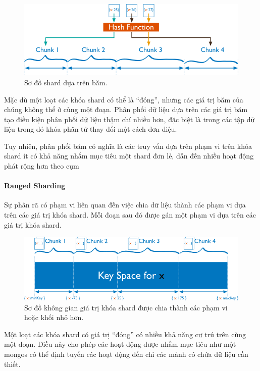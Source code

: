 \begin{figure}[h!]
\centering
\captionsetup{justification=centering,margin=1cm}
  	\includegraphics[scale=0.5]{charts/sharding-hash-based.png}
  \caption{Sơ đồ shard dựa trên băm.}
  \end{figure}

Mặc dù một loạt các khóa shard có thể là “đóng”, nhưng các giá trị băm của chúng không thể ở cùng một đoạn. Phân phối dữ liệu dựa trên các giá trị băm tạo điều kiện phân phối dữ liệu thậm chí nhiều hơn, đặc biệt là trong các tập dữ liệu trong đó khóa phân tử thay đổi một cách đơn điệu.

Tuy nhiên, phân phối băm có nghĩa là các truy vấn dựa trên phạm vi trên khóa shard ít có khả năng nhắm mục tiêu một shard đơn lẻ, dẫn đến nhiều hoạt động phát rộng hơn theo cụm

\paragraph{Ranged Sharding}
Sự phân rã có phạm vi liên quan đến việc chia dữ liệu thành các phạm vi dựa trên các giá trị khóa shard. Mỗi đoạn sau đó được gán một phạm vi dựa trên các giá trị khóa shard.

\begin{figure}[h!]
\centering
\captionsetup{justification=centering,margin=1cm}
  	\includegraphics[scale=0.5]{charts/sharding-range-based.png}
  \caption{Sơ đồ không gian giá trị khóa shard được chia thành các phạm vi hoặc khối nhỏ hơn.}
  \end{figure}

Một loạt các khóa shard có giá trị “đóng” có nhiều khả năng cư trú trên cùng một đoạn. Điều này cho phép các hoạt động được nhắm mục tiêu như một mongos có thể định tuyến các hoạt động đến chỉ các mảnh có chứa dữ liệu cần thiết.

